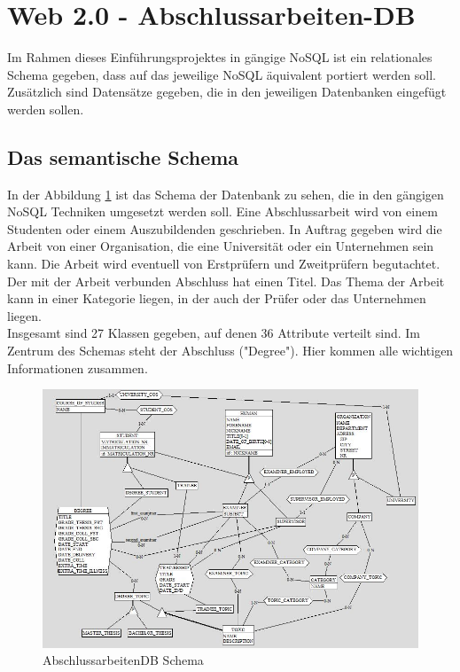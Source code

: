 \section{Web 2.0 - Abschlussarbeiten-DB}
Im Rahmen dieses Einführungsprojektes in gängige NoSQL ist ein relationales Schema gegeben, dass auf das jeweilige NoSQL äquivalent portiert werden soll. Zusätzlich sind Datensätze gegeben, die in den jeweiligen Datenbanken eingefügt werden sollen. 

\subsection{Das semantische Schema}
In der Abbildung \ref{fig:schema1} ist das Schema der Datenbank zu sehen, die in den gängigen NoSQL Techniken umgesetzt werden soll. Eine Abschlussarbeit wird von einem Studenten oder einem Auszubildenden geschrieben. In Auftrag gegeben wird die Arbeit von einer Organisation, die eine Universität oder ein Unternehmen sein kann. Die Arbeit wird eventuell von Erstprüfern und Zweitprüfern begutachtet. Der mit der Arbeit verbunden Abschluss hat einen Titel. Das Thema der Arbeit kann in einer Kategorie liegen, in der auch der Prüfer oder das Unternehmen liegen.\\

Insgesamt sind 27 Klassen gegeben, auf denen 36 Attribute verteilt sind. Im Zentrum des Schemas steht der Abschluss ("Degree"). Hier kommen alle wichtigen Informationen zusammen. \\

\begin{figure}[H]
	\centering
	\includegraphics[scale=0.6]{images/01abschlussarbeitendbschema.jpg} 
	\caption{AbschlussarbeitenDB Schema}\label{fig:schema1}
\end{figure}

